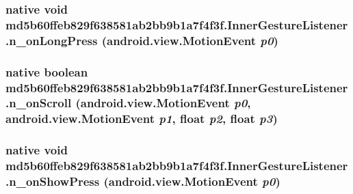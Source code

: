\hypertarget{classmd5b60ffeb829f638581ab2bb9b1a7f4f3f_1_1_inner_gesture_listener_138e509e3561574241324ed8b861ce6f}{
\subsubsection[{n\_\-onLongPress}]{\setlength{\rightskip}{0pt plus 5cm}native void md5b60ffeb829f638581ab2bb9b1a7f4f3f.InnerGestureListener.n\_\-onLongPress (android.view.MotionEvent {\em p0})}}
\label{classmd5b60ffeb829f638581ab2bb9b1a7f4f3f_1_1_inner_gesture_listener_138e509e3561574241324ed8b861ce6f}


\hypertarget{classmd5b60ffeb829f638581ab2bb9b1a7f4f3f_1_1_inner_gesture_listener_dd13fc7286a83c759b9c172f24202ee3}{
\subsubsection[{n\_\-onScroll}]{\setlength{\rightskip}{0pt plus 5cm}native boolean md5b60ffeb829f638581ab2bb9b1a7f4f3f.InnerGestureListener.n\_\-onScroll (android.view.MotionEvent {\em p0}, \/  android.view.MotionEvent {\em p1}, \/  float {\em p2}, \/  float {\em p3})}}
\label{classmd5b60ffeb829f638581ab2bb9b1a7f4f3f_1_1_inner_gesture_listener_dd13fc7286a83c759b9c172f24202ee3}


\hypertarget{classmd5b60ffeb829f638581ab2bb9b1a7f4f3f_1_1_inner_gesture_listener_67d6c8bf2cf830eab38fd1049f89602b}{
\subsubsection[{n\_\-onShowPress}]{\setlength{\rightskip}{0pt plus 5cm}native void md5b60ffeb829f638581ab2bb9b1a7f4f3f.InnerGestureListener.n\_\-onShowPress (android.view.MotionEvent {\em p0})}}
\label{classmd5b60ffeb829f638581ab2bb9b1a7f4f3f_1_1_inner_gesture_listener_67d6c8bf2cf830eab38fd1049f89602b}


